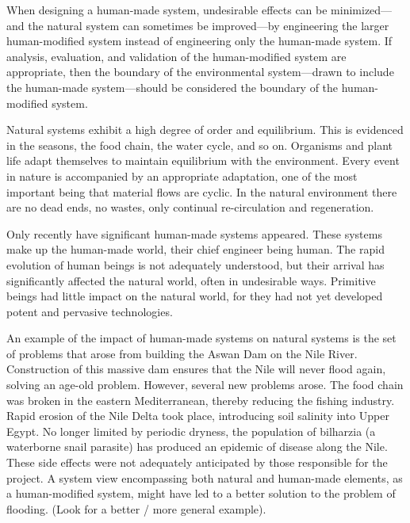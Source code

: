 When designing a human-made system, undesirable effects can be minimized—and the natural system can sometimes be improved—by engineering the larger human-modified system instead of engineering only the human-made system. If analysis, evaluation, and validation of the human-modified system are appropriate, then the boundary of the environmental system—drawn to include the human-made system—should be considered the boundary of the human-modified system.

Natural systems exhibit a high degree of order and equilibrium. This is evidenced in the seasons, the food chain, the water cycle, and so on. Organisms and plant life adapt themselves to maintain equilibrium with the environment. Every event in nature is accompanied by an appropriate adaptation, one of the most important being that material flows are cyclic. In the natural environment there are no dead ends, no wastes, only continual re-circulation and regeneration.

Only recently have significant human-made systems appeared. These systems make up the human-made world, their chief engineer being human. The rapid evolution of human beings is not adequately understood, but their arrival has significantly affected the natural world, often in undesirable ways. Primitive beings had little impact on the natural world, for they had not yet developed potent and pervasive technologies.

An example of the impact of human-made systems on natural systems is the set of problems that arose from building the Aswan Dam on the Nile River. Construction of this massive dam ensures that the Nile will never flood again, solving an age-old problem. However, several new problems arose. The food chain was broken in the eastern Mediterranean, thereby reducing the fishing industry. Rapid erosion of the Nile Delta took place, introducing soil salinity into Upper Egypt. No longer limited by periodic dryness, the population of bilharzia (a waterborne snail parasite) has produced an epidemic of disease along the Nile. These side effects were not adequately anticipated by those responsible for the project. A system view encompassing both natural and human-made elements, as a human-modified system, might have led to a better solution to the problem of flooding. (Look for a better / more general example).


